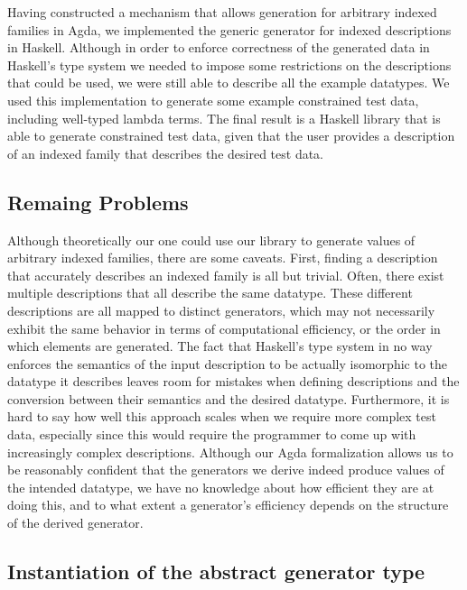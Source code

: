 \documentclass[a4paper,msc,twosized=semi]{uustthesis}
\begin{document}
  Having constructed a mechanism that allows generation for arbitrary indexed families 
  in Agda, we implemented the generic generator for indexed descriptions in Haskell. 
  Although in order to enforce correctness of the generated data in Haskell's type 
  system we needed to impose some restrictions on the descriptions that could be used, 
  we were still able to describe all the example datatypes. We used this 
  implementation to generate some example constrained test data, including well-typed 
  lambda terms. The final result is a Haskell library that is able to generate 
  constrained test data, given that the user provides a description of an indexed 
  family that describes the desired test data. 
  
\subsection{Remaing Problems}

  Although theoretically our one could use our library to generate values of arbitrary 
  indexed families, there are some caveats. First, finding a description that 
  accurately describes an indexed family is all but trivial. Often, there exist 
  multiple descriptions that all describe the same datatype. These different 
  descriptions are all mapped to distinct generators, which may not necessarily 
  exhibit the same behavior in terms of computational efficiency, or the order in 
  which elements are generated. The fact that Haskell's type system in no way enforces 
  the semantics of the input description to be actually isomorphic to the datatype it 
  describes leaves room for mistakes when defining descriptions and the conversion 
  between their semantics and the desired datatype. Furthermore, it is hard to say how 
  well this approach scales when we require more complex test data, especially since 
  this would require the programmer to come up with increasingly complex descriptions. 
  Although our Agda formalization allows us to be reasonably confident that the 
  generators we derive indeed produce values of the intended datatype, we have no 
  knowledge about how efficient they are at doing this, and to what extent a 
  generator's efficiency depends on the structure of the derived generator. 

\subsection{Instantiation of the abstract generator type}
\end{document}
